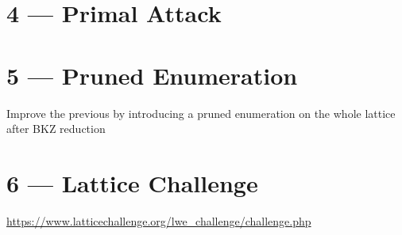 \documentclass[10pt,a4paper]{tufte-handout}
\begin{document}
\section{4 — Primal Attack}
\label{sec:org318d91a}

\section{5 — Pruned Enumeration}
\label{sec:orgc0f01dd}

Improve the previous by introducing a pruned enumeration on the whole lattice after BKZ reduction

\section{6 — Lattice Challenge}
\label{sec:org8dc7c85}

\url{https://www.latticechallenge.org/lwe\_challenge/challenge.php}
\end{document}
